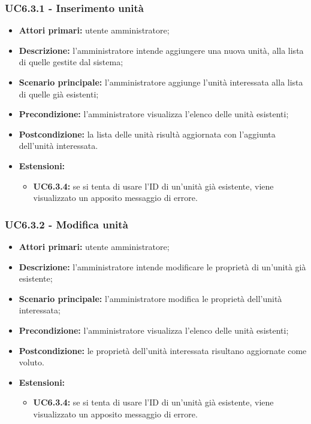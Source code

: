 \subsubsection{UC6.3.1 - Inserimento unità}
\begin{itemize}
	\item \textbf{Attori primari:} utente amministratore;
	\item \textbf{Descrizione:} l'amministratore intende aggiungere una nuova unità, alla lista di quelle gestite dal sistema;
	\item \textbf{Scenario principale:} l'amministratore aggiunge l'unità interessata alla lista di quelle già esistenti;
	\item \textbf{Precondizione:} l'amministratore visualizza l'elenco delle unità esistenti;
	\item \textbf{Postcondizione:} la lista delle unità risultà aggiornata con l'aggiunta dell'unità interessata.
	\item \textbf{Estensioni:}
	\begin{itemize}
		\item \textbf{UC6.3.4:} se si tenta di usare l'ID di un'unità già esistente, viene visualizzato un apposito messaggio di errore.
	\end{itemize}
\end{itemize}

\subsubsection{UC6.3.2 - Modifica unità}
\begin{itemize}
	\item \textbf{Attori primari:} utente amministratore;
	\item \textbf{Descrizione:} l'amministratore intende modificare le proprietà di un'unità già esistente;
	\item \textbf{Scenario principale:} l'amministratore modifica le proprietà dell'unità interessata;
	\item \textbf{Precondizione:} l'amministratore visualizza l'elenco delle unità esistenti;
	\item \textbf{Postcondizione:} le proprietà dell'unità interessata risultano aggiornate come voluto.
	\item \textbf{Estensioni:}
	\begin{itemize}
		\item \textbf{UC6.3.4:} se si tenta di usare l'ID di un'unità già esistente, viene visualizzato un apposito messaggio di errore.
	\end{itemize}
\end{itemize}

